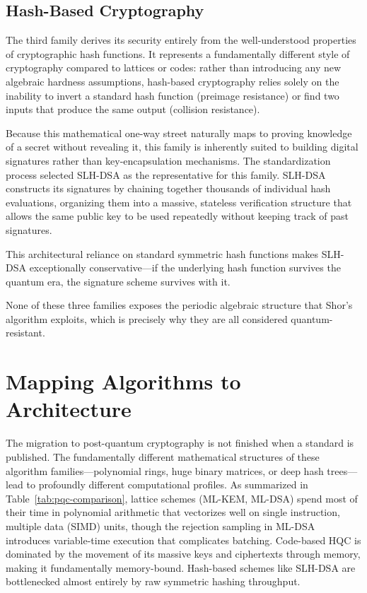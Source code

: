 \subsection{Hash-Based Cryptography}
\label{subsec:hash-crypto}

The third family derives its security entirely from the well-understood properties of cryptographic hash functions. It represents a fundamentally different style of cryptography compared to lattices or codes: rather than introducing any new algebraic hardness assumptions, hash-based cryptography relies solely on the inability to invert a standard hash function (preimage resistance) or find two inputs that produce the same output (collision resistance).

Because this mathematical one-way street naturally maps to proving knowledge of a secret without revealing it, this family is inherently suited to building digital signatures rather than key-encapsulation mechanisms. The standardization process selected SLH-DSA as the representative for this family. SLH-DSA constructs its signatures by chaining together thousands of individual hash evaluations, organizing them into a massive, stateless verification structure that allows the same public key to be used repeatedly without keeping track of past signatures.

This architectural reliance on standard symmetric hash functions makes SLH-DSA exceptionally conservative---if the underlying hash function survives the quantum era, the signature scheme survives with it.

None of these three families exposes the periodic algebraic structure that Shor's algorithm exploits, which is precisely why they are all considered quantum-resistant.

\section{Mapping Algorithms to Architecture}
\label{sec:pqc-offload}

The migration to post-quantum cryptography is not finished when a standard is published. The fundamentally different mathematical structures of these algorithm families---polynomial rings, huge binary matrices, or deep hash trees---lead to profoundly different computational profiles. As summarized in Table~\ref{tab:pqc-comparison}, lattice schemes (ML-KEM, ML-DSA) spend most of their time in polynomial arithmetic that vectorizes well on single instruction, multiple data (SIMD) units, though the rejection sampling in ML-DSA introduces variable-time execution that complicates batching. Code-based HQC is dominated by the movement of its massive keys and ciphertexts through memory, making it fundamentally memory-bound. Hash-based schemes like SLH-DSA are bottlenecked almost entirely by raw symmetric hashing throughput.


